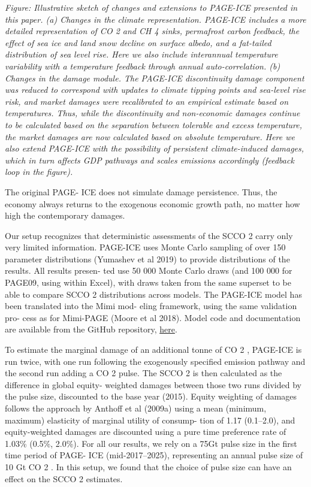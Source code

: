 \documentclass[
]{book}
\begin{document}
\emph{Figure: Illustrative sketch of changes and extensions to PAGE-ICE presented in this paper. (a) Changes in the climate
representation. PAGE-ICE includes a more detailed representation of CO 2 and CH 4 sinks, permafrost carbon feedback, the effect
of sea ice and land snow decline on surface albedo, and a fat-tailed distribution of sea level rise. Here we also include interannual
temperature variability with a temperature feedback through annual auto-correlation. (b) Changes in the damage module. The
PAGE-ICE discontinuity damage component was reduced to correspond with updates to climate tipping points and sea-level rise
risk, and market damages were recalibrated to an empirical estimate based on temperatures. Thus, while the discontinuity and
non-economic damages continue to be calculated based on the separation between tolerable and excess temperature, the market
damages are now calculated based on absolute temperature. Here we also extend PAGE-ICE with the possibility of persistent
climate-induced damages, which in turn affects GDP pathways and scales emissions accordingly (feedback loop in the figure).}

The original PAGE-
ICE does not simulate damage persistence. Thus, the
economy always returns to the exogenous economic
growth path, no matter how high the contemporary
damages.

Our setup recognizes that deterministic assessments
of the SCCO 2 carry only very limited information.
PAGE-ICE uses Monte Carlo sampling of over 150
parameter distributions (Yumashev et al 2019) to
provide distributions of the results. All results presen-
ted use 50 000 Monte Carlo draws (and 100 000 for
PAGE09, using \citet{RISK} within Excel), with draws
taken from the same superset to be able to compare
SCCO 2 distributions across models. The PAGE-ICE
model has been translated into the Mimi mod-
eling framework, using the same validation pro-
cess as for Mimi-PAGE (Moore et al 2018). Model
code and documentation are available from the
GitHub repository, \href{https://github.com/openmodels/MimiPAGE2020.jl}{here}.

To estimate the marginal damage of an additional
tonne of CO 2 , PAGE-ICE is run twice, with one run
following the exogenously specified emission pathway
and the second run adding a CO 2 pulse. The SCCO 2
is then calculated as the difference in global equity-
weighted damages between those two runs divided
by the pulse size, discounted to the base year (2015).
Equity weighting of damages follows the approach
by Anthoff et al (2009a) using a mean (minimum,
maximum) elasticity of marginal utility of consump-
tion of 1.17 (0.1--2.0), and equity-weighted damages
are discounted using a pure time preference rate of
1.03\% (0.5\%, 2.0\%). For all our results, we rely on
a 75Gt pulse size in the first time period of PAGE-
ICE (mid-2017--2025), representing an annual pulse
size of 10 Gt CO 2 . In this setup, we found that
the choice of pulse size can have an effect on the
SCCO 2 estimates.
\end{document}
